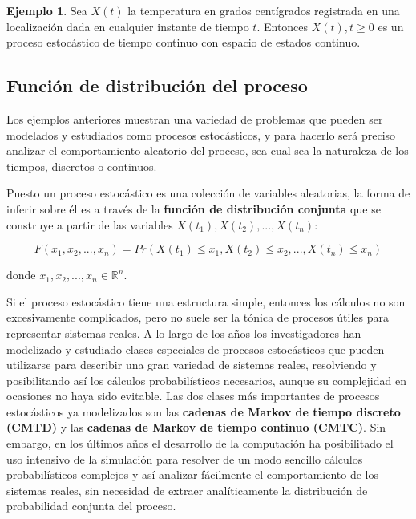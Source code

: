 \documentclass[
]{book}
\theoremstyle{definition}
\theoremstyle{definition}
\newtheorem{example}{Ejemplo}[chapter]
\theoremstyle{definition}
\theoremstyle{definition}
\theoremstyle{remark}
\begin{document}
\begin{example}
\protect\hypertarget{exm:petc5}{}\label{exm:petc5}Sea \(X(t)\) la temperatura en grados centígrados registrada en una localización dada en cualquier instante de tiempo \(t\). Entonces \(X(t), t \geq 0\) es un proceso estocástico de tiempo continuo con espacio de estados continuo.
\end{example}

\hypertarget{funciuxf3n-de-distribuciuxf3n-del-proceso}{%
\subsection{Función de distribución del proceso}\label{funciuxf3n-de-distribuciuxf3n-del-proceso}}

Los ejemplos anteriores muestran una variedad de problemas que pueden ser modelados y estudiados como procesos estocásticos, y para hacerlo será preciso analizar el comportamiento aleatorio del proceso, sea cual sea la naturaleza de los tiempos, discretos o continuos.

Puesto un proceso estocástico es una colección de variables aleatorias, la forma de inferir sobre él es a través de la \textbf{función de distribución conjunta} que se construye a partir de las variables \(X(t_1), X(t_2),...,X(t_n)\):

\begin{equation}
F(x_1, x_2,...,x_n) = Pr(X(t_1) \leq x_1, X(t_2) \leq x_2,..., X(t_n) \leq x_n) 
\label{eq:dproceso}
\end{equation}

donde \(x_1, x_2,..., x_n \in \mathbb{R}^n.\)

Si el proceso estocástico tiene una estructura simple, entonces los cálculos no son excesivamente complicados, pero no suele ser la tónica de procesos útiles para representar sistemas reales. A lo largo de los años los investigadores han modelizado y estudiado clases especiales de procesos estocásticos que pueden utilizarse para describir una gran variedad de sistemas reales, resolviendo y posibilitando así los cálculos probabilísticos necesarios, aunque su complejidad en ocasiones no haya sido evitable. Las dos clases más importantes de procesos estocásticos ya modelizados son las \textbf{cadenas de Markov de tiempo discreto (CMTD)} y las \textbf{cadenas de Markov de tiempo continuo (CMTC)}. Sin embargo, en los últimos años el desarrollo de la computación ha posibilitado el uso intensivo de la simulación para resolver de un modo sencillo cálculos probabilísticos complejos y así analizar fácilmente el comportamiento de los sistemas reales, sin necesidad de extraer analíticamente la distribución de probabilidad conjunta del proceso.
\end{document}
